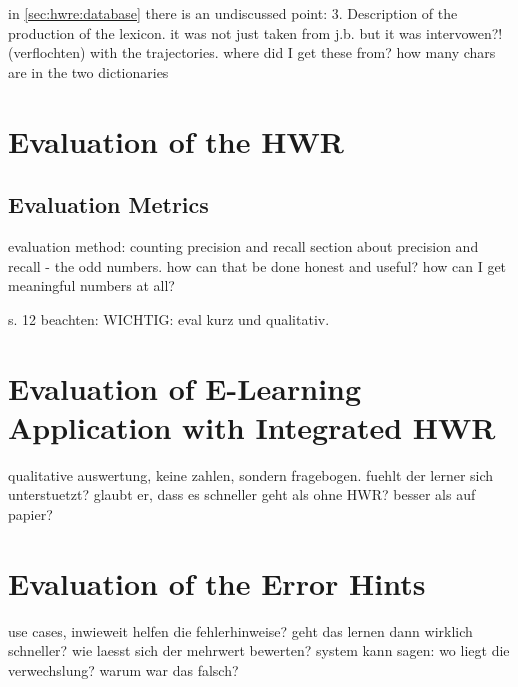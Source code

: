 in \ref{sec:hwre:database} there is an undiscussed point:
   3. Description of the production of the lexicon.
      it was not just taken from j.b. but it was intervowen?! (verflochten) 
      with the trajectories. where did I get these from? 
      how many chars are in the two dictionaries


\section{Evaluation of the HWR}
\subsection{ Evaluation Metrics }
evaluation method: counting precision and recall
section about precision and recall - the odd numbers.
how can that be done honest and useful?
how can I get meaningful numbers at all?

s. 12 beachten: WICHTIG: eval kurz und qualitativ.

\section{Evaluation of E-Learning Application with Integrated HWR}
qualitative auswertung, keine zahlen, sondern fragebogen.
fuehlt der lerner sich unterstuetzt? glaubt er, dass es schneller geht als ohne 
HWR? 
besser als auf papier?

\section{Evaluation of the Error Hints}
use cases, inwieweit helfen die fehlerhinweise?
geht das lernen dann wirklich schneller?
wie laesst sich der mehrwert bewerten?
system kann sagen: wo liegt die verwechslung? warum war das falsch?


